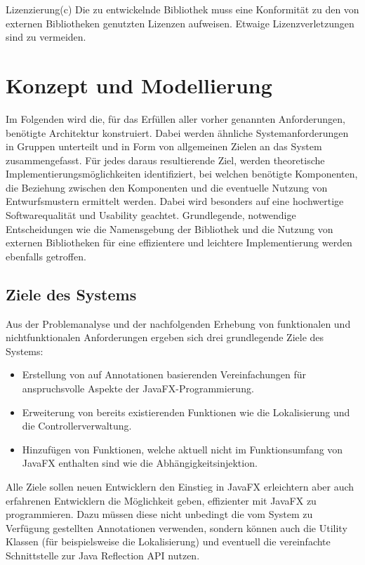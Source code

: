 \begin{nreq}{Lizenzierung}(c)
	Die zu entwickelnde Bibliothek muss eine Konformität zu den von externen Bibliotheken genutzten Lizenzen aufweisen. Etwaige Lizenzverletzungen sind zu vermeiden.
\end{nreq}
\section{Konzept und Modellierung}
\label{konzept_und_modellierung}
Im Folgenden wird die, für das Erfüllen aller vorher genannten Anforderungen, benötigte Architektur konstruiert. Dabei werden ähnliche Systemanforderungen in Gruppen unterteilt und in Form von allgemeinen Zielen an das System zusammengefasst. Für jedes daraus resultierende Ziel, werden theoretische Implementierungsmöglichkeiten identifiziert, bei welchen benötigte Komponenten, die Beziehung zwischen den Komponenten und die eventuelle Nutzung von Entwurfsmustern ermittelt werden. Dabei wird besonders auf eine hochwertige Softwarequalität und Usability geachtet. Grundlegende, notwendige Entscheidungen wie die Namensgebung der Bibliothek und die Nutzung von externen Bibliotheken für eine effizientere und leichtere Implementierung werden ebenfalls getroffen. 
\subsection{Ziele des Systems}
Aus der Problemanalyse und der nachfolgenden Erhebung von funktionalen und nichtfunktionalen Anforderungen ergeben sich drei grundlegende Ziele des Systems:
\begin{itemize}
	\item Erstellung von auf Annotationen basierenden Vereinfachungen für anspruchsvolle Aspekte der JavaFX-Programmierung.
	\item Erweiterung von bereits existierenden Funktionen wie die Lokalisierung und die Controllerverwaltung.
	\item Hinzufügen von Funktionen, welche aktuell nicht im Funktionsumfang von JavaFX enthalten sind wie die Abhängigkeitsinjektion.
\end{itemize}
Alle Ziele sollen neuen Entwicklern den Einstieg in JavaFX erleichtern aber auch erfahrenen Entwicklern die Möglichkeit geben, effizienter mit JavaFX zu programmieren. Dazu müssen diese nicht unbedingt die vom System zu Verfügung gestellten Annotationen verwenden, sondern können auch die Utility Klassen (für beispielsweise die Lokalisierung) und eventuell die vereinfachte Schnittstelle zur Java Reflection API nutzen.

